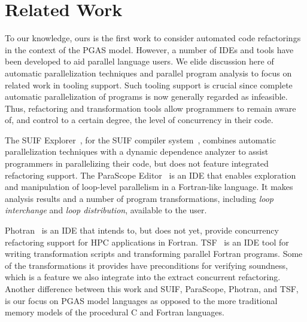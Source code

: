 \section{Related Work}
\label{sec:related}

To our knowledge, ours is the first work to consider automated code
refactorings in the context of the PGAS model.  However,
a number of IDEs and
tools have been developed to aid parallel language users. 
We elide discussion here of automatic parallelization
techniques and parallel program analysis to focus on
related work in tooling support. Such tooling support is crucial since complete
automatic parallelization of programs is now generally regarded as infeasible.
Thus, refactoring and transformation tools allow programmers to remain aware
of, and control to a certain degree, the level of concurrency in their
code.

The SUIF Explorer~\cite{Liao99}, for the SUIF compiler
system~\cite{SUIF}, combines automatic parallelization techniques with a
dynamic dependence analyzer to assist programmers in parallelizing their
code, but does not feature integrated refactoring support.
The ParaScope Editor~\cite{Kennedy91,Hall93} is an IDE that
enables exploration and manipulation of
loop-level parallelism in a Fortran-like language. It makes
analysis results and a number of program transformations, including {\em loop
interchange} and {\em loop distribution}, available to the user.

Photran~\cite{Overbey05} is an IDE that intends to, but does not yet, 
provide concurrency refactoring support for HPC applications in Fortran.
TSF~\cite{TSF} is an IDE tool for writing
transformation scripts and transforming parallel Fortran programs. Some of
the transformations it provides have preconditions for verifying soundness,
which is a feature we also integrate into the extract concurrent
refactoring. Another difference between this work and SUIF, ParaScope, Photran,
and TSF, is our focus on PGAS model languages as opposed to the more traditional
memory models of the procedural C and Fortran languages.
%

